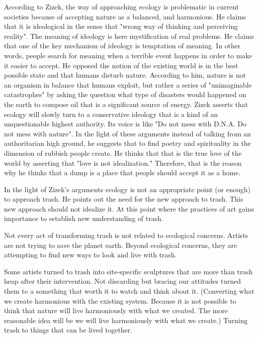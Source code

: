 According to Zizek, the way of approaching ecology is problematic in current societies because of accepting nature as a balanced, and harmonious. He claims that it is ideological in the sense that "wrong way of thinking and perceiving reality". The meaning of ideology is here mystification of real problems. He claims that one of the key mechanism of ideology is temptation of meaning. In other words, people search for meaning when a terrible event happens in order to make it easier to accept. He opposed the notion of the existing world is in the best possible state and that humans disturb nature. According to him, nature is not an organism in balance that humans exploit, but rather a series of "unimaginable catastrophes" by asking the question what type of disasters would happened on the earth to compose oil that is a significant source of energy. Zizek asserts that ecology will slowly turn to a conservative ideology that is a kind of an unquestionable highest authority. Its voice is like "Do not mess with D.N.A. Do not mess with nature". In the light of these arguments instead of talking from an authoritarian high ground, he suggests that to find poetry and spirituality in the dimension of rubbish people create. He thinks that that is the true love of the world by asserting that "love is not idealization." Therefore, that is the reason why he thinks that a dump is a place that people should accept it as a home. 

In the light of Zizek's arguments ecology is not an appropriate point (or enough) to approach trash. He points out the need for the new approach to trash. This new approach should not idealize it. At this point where the practices of art gains importance to establish new understanding of trash.

Not every act of transforming trash is not related to ecological concerns. Artists are not trying to save the planet earth. Beyond ecological concerns, they are attempting to find new ways to look and live with trash. 

Some artists turned to trash into site-specific sculptures that are more than trash heap after their intervention. Not discarding but bracing our attitudes turned them to a something that worth it to watch and think about it. (Converting what we create harmonious with the existing system. Because it is not possible to think that nature will live harmoniously with what we created. The more reasonable idea will be we will live harmoniously with what we create.) Turning trash to things that can be lived together.

